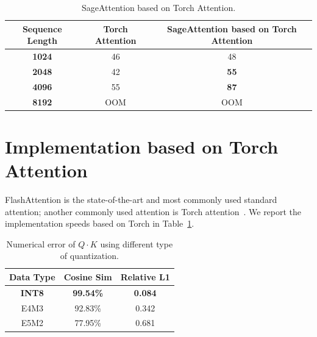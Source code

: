 \begin{table}[!htb]
\caption{SageAttention based on Torch Attention.}
\label{tab:torch+sage}
\setlength\tabcolsep{12pt}
\centering 
    \begin{tabular}{c|c|c} 
    \toprule
    \textbf{Sequence Length} & \textbf{Torch Attention} & \textbf{SageAttention based on Torch Attention} \\
    \hline
    \bf 1024  & 46 & 48 \\ 
    \bf 2048  & 42  & \textbf{55} \\
    \bf 4096 & 55 & \textbf{87} \\
    \bf 8192 & OOM  & OOM \\  \bottomrule
    \end{tabular}
\end{table}

\section{Implementation based on Torch Attention}
FlashAttention is the state-of-the-art and most commonly used standard attention; another commonly used attention is Torch attention~\citep{pytorchBackend2024}. We report the implementation speeds based on Torch in Table~\ref{tab:torch+sage}.









\begin{table}[htb!]
    \centering
    \caption{Numerical error of $Q \cdot K$ using different type of quantization.}
    \label{tab:qk_error}
    \setlength\tabcolsep{12pt}
    \begin{tabular}{c||c|c}
        \toprule
        {\bf Data Type}  & {\bf Cosine Sim}  & {\bf Relative L1}   \\ \hline
        \bf INT8   &   \textbf{99.54\%}    & \textbf{0.084}   \\ 
        E4M3   &   92.83\%    & 0.342   \\ 
        E5M2   &   77.95\%    & 0.681   \\ \bottomrule
    \end{tabular}
\end{table}

